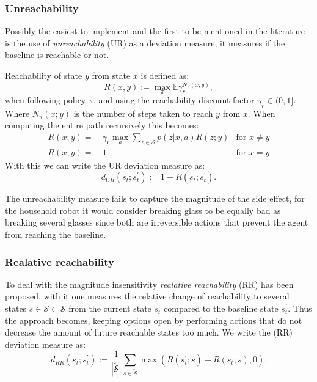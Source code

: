 \documentclass[12pt,A4]{report}
\theoremstyle{definition}
\begin{document}
\subsubsection{Unreachability}
Possibly the easiest to implement and the first to be mentioned in the literature is the use of \textit{unreachability} (UR) as a deviation measure, it measures if the baseline is reachable or not. 

Reachability of state $y$ from state $x$ is defined as:
\[ R(x, y) := \max_\pi\mathbb{E}\gamma_r^{N_\pi(x;y)},\]
when following policy $\pi$, and using the reachability discount factor $\gamma_r \in (0, 1]$. Where $N_\pi(x;y)$ is the number of steps taken to reach $y$ from $x$. When computing the entire path recursively this becomes:
\begin{align*}
  R(x;y) =& \ \gamma_r \max_a \sum_{z \in \mathcal{S}}p(z|x,a)R(z;y) & \text{for } x \neq y\\
  R(x;y) =& \ 1 & \text{for } x = y
\end{align*}
With this we can write the UR deviation measure as:
\[ d_{UR}(s_t;s_t^\prime) := 1 - R(s_t;s_t^\prime).\]

The unreachability measure fails to capture the magnitude of the side effect, for the household robot it would consider breaking glass to be equally bad as breaking several glasses since both are irreversible actions that prevent the agent from reaching the baseline.  


\subsubsection{Realative reachability}
To deal with the magnitude insensitivity \textit{realative reachability} (RR) has been proposed, with it one measures the relative change of reachability to several states $s \in \tilde{\mathcal{S}} \subset \mathcal{S}$ from the current state $s_t$ compared to the baseline state $s_t^\prime$. Thus the approach becomes, keeping options open by performing actions that do not decrease the amount of future reachable states too much. We write the (RR) deviation measure as:
\[d_{RR}(s_t;s^{\prime}_t) := \frac{1}{|\tilde{\mathcal{S}}|}\sum_{s\in\tilde{\mathcal{S}}} \max (R(s^{\prime}_t;s) - R(s_t;s), 0).\]
\end{document}
